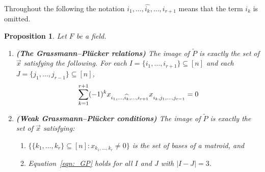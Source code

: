 \documentclass[10pt, preprint]{article}
\newtheorem{prop}[theorem]{Proposition}
\theoremstyle{definition}
\begin{document}
Throughout the following the notation $i_{1}, \ldots ,
\widehat{i_{k}}, \ldots , i_{r+1}$ means that the term $i_{k}$ is
omitted.\vspace*{-1pt}

\begin{prop}
\label{prop:GP}
Let $F$ be a field.\vspace*{-2pt}
%
\begin{enumerate}[\textit{2.}]%
\item[\textit{1.}]
\textup{\textbf{(The Grassmann--Pl\"{u}cker relations)}} The image of $\tilde{P}$
is exactly the set of $\vec{x}$ satisfying the following. For each
$I=\{i_{1}, \ldots , i_{r+1}\}\subseteq [n]$ and each $J=\{j_{1},
\ldots , j_{r-1}\}\subseteq [n]$,
%
\begin{equation}
\label{eqn:_GP}
\sum _{k=1}^{r+1} (-1)^{k} x_{i_{1}, \ldots , \widehat{i_{k}},
\ldots , i_{r+1}}x_{i_{k},j_{1}, \ldots , j_{r-1}
\vphantom{\widehat{i_{k}}}}=0
\end{equation}
%
\item[\textit{2.}]
\textup{\textbf{(Weak Grassmann--Pl\"{u}cker conditions)}} The image of
$\tilde{P}$ is exactly the set of $\vec{x}$ satisfying:\vspace*{-2pt}
%
\begin{enumerate}[\textit{(a)}]%
\item[\textit{(a)}]
$\{\{k_{1}, \ldots , k_{r}\}\subseteq [n]: x_{k_{1}, \ldots , k_{r}}
\neq 0\}$ is the set of bases of a matroid, and
%
\item[\textit{(b)}]
Equation~\eqref{eqn:_GP} holds for all $I$ and $J$ with $|I-J|=3$.\vspace*{-2pt}
\end{enumerate}
%
\end{enumerate}
%
\end{prop}
\end{document}
